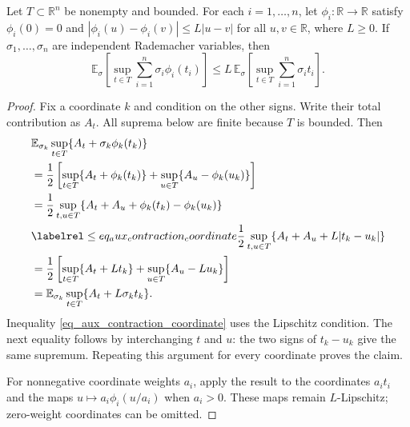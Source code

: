 \documentclass[twoside,11pt]{article}
\newenvironment{revision}{\color{revisionred}}{}
\begin{document}
\begin{revision}
\begin{lemma}
\label{lem:Theorem 7}
Let $T\subset\mathbb R^n$ be nonempty and bounded. For each
$i=1,\ldots,n$, let $\phi_i:\mathbb R\to\mathbb R$ satisfy
$\phi_i(0)=0$ and
$|\phi_i(u)-\phi_i(v)|\leq L|u-v|$ for all $u,v\in\mathbb R$,
where $L\geq0$. If $\sigma_1,\ldots,\sigma_n$ are independent
Rademacher variables, then
\[
\mathbb E_\sigma\left[
\sup_{t\in T}\sum_{i=1}^n\sigma_i\phi_i(t_i)\right]
\leq
L\,\mathbb E_\sigma\left[
\sup_{t\in T}\sum_{i=1}^n\sigma_i t_i\right].
\]
\end{lemma}

\begin{proof}
Fix a coordinate $k$ and condition on the other signs.
Write their total contribution as $A_t$. All suprema below
are finite because $T$ is bounded. Then
\begin{align*}
&\mathbb E_{\sigma_k}
\sup_{t\in T}\{A_t+\sigma_k\phi_k(t_k)\}\\
&=\frac12\left[
\sup_{t\in T}\{A_t+\phi_k(t_k)\}
+\sup_{u\in T}\{A_u-\phi_k(u_k)\}\right]\\
&=\frac12\sup_{t,u\in T}
\{A_t+A_u+\phi_k(t_k)-\phi_k(u_k)\}\\
&\labelrel\leq{eq_aux_contraction_coordinate}
\frac12\sup_{t,u\in T}\{A_t+A_u+L|t_k-u_k|\}\\
&=\frac12\left[
\sup_{t\in T}\{A_t+Lt_k\}
+\sup_{u\in T}\{A_u-Lu_k\}\right]\\
&=\mathbb E_{\sigma_k}\sup_{t\in T}\{A_t+L\sigma_k t_k\}.
\end{align*}
Inequality \eqref{eq_aux_contraction_coordinate} uses the
Lipschitz condition. The next equality follows by interchanging
$t$ and $u$: the two signs of $t_k-u_k$ give the same supremum.
Repeating this argument for every coordinate proves the claim.

For nonnegative coordinate weights $a_i$, apply the result to
the coordinates $a_i t_i$ and the maps
$u\mapsto a_i\phi_i(u/a_i)$ when $a_i>0$.
These maps remain $L$-Lipschitz; zero-weight coordinates can
be omitted.
\end{proof}
\end{revision}
\end{document}
